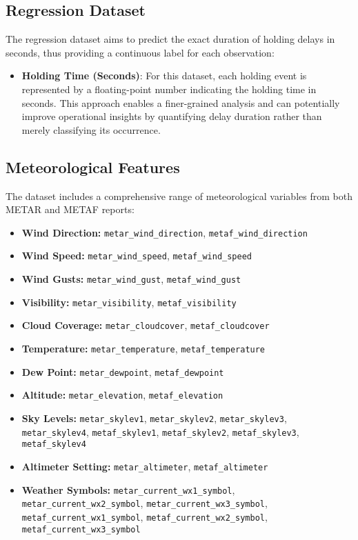 \subsection{Regression Dataset}
The regression dataset aims to predict the exact duration of holding delays in seconds, thus providing a continuous label for each observation:
\begin{itemize}
    \item \textbf{Holding Time (Seconds)}: For this dataset, each holding event is represented by a floating-point number indicating the holding time in seconds. This approach enables a finer-grained analysis and can potentially improve operational insights by quantifying delay duration rather than merely classifying its occurrence.
\end{itemize}


\subsection{Meteorological Features}
The dataset includes a comprehensive range of meteorological variables from both METAR and METAF reports:

\begin{itemize}
    \item \textbf{Wind Direction:} \texttt{metar\_wind\_direction}, \texttt{metaf\_wind\_direction}
    \item \textbf{Wind Speed:} \texttt{metar\_wind\_speed}, \texttt{metaf\_wind\_speed}
    \item \textbf{Wind Gusts:} \texttt{metar\_wind\_gust}, \texttt{metaf\_wind\_gust}
    \item \textbf{Visibility:} \texttt{metar\_visibility}, \texttt{metaf\_visibility}
    \item \textbf{Cloud Coverage:} \texttt{metar\_cloudcover}, \texttt{metaf\_cloudcover}
    \item \textbf{Temperature:} \texttt{metar\_temperature}, \texttt{metaf\_temperature}
    \item \textbf{Dew Point:} \texttt{metar\_dewpoint}, \texttt{metaf\_dewpoint}
    \item \textbf{Altitude:} \texttt{metar\_elevation}, \texttt{metaf\_elevation}
    \item \textbf{Sky Levels:} \texttt{metar\_skylev1}, \texttt{metar\_skylev2}, \texttt{metar\_skylev3}, \texttt{metar\_skylev4}, \texttt{metaf\_skylev1}, \texttt{metaf\_skylev2}, \texttt{metaf\_skylev3}, \texttt{metaf\_skylev4}
    \item \textbf{Altimeter Setting:} \texttt{metar\_altimeter}, \texttt{metaf\_altimeter}
    \item \textbf{Weather Symbols:} \texttt{metar\_current\_wx1\_symbol}, \texttt{metar\_current\_wx2\_symbol}, \texttt{metar\_current\_wx3\_symbol}, \texttt{metaf\_current\_wx1\_symbol}, \texttt{metaf\_current\_wx2\_symbol}, \texttt{metaf\_current\_wx3\_symbol}
\end{itemize}


